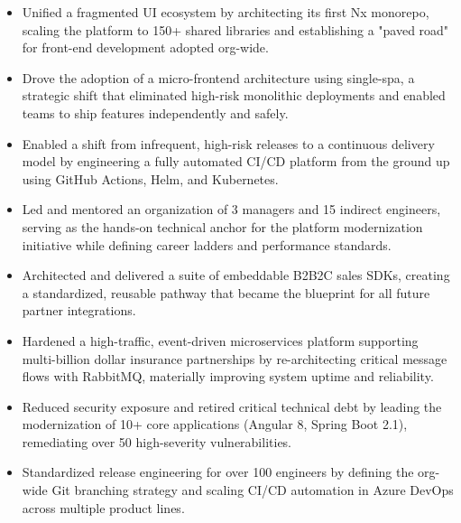 \begin{itemize}[leftmargin=*]
    \item Unified a fragmented UI ecosystem by architecting its first Nx monorepo, scaling the platform to 150+ shared libraries and establishing a "paved road" for front-end development adopted org-wide.
    \item Drove the adoption of a micro-frontend architecture using single-spa, a strategic shift that eliminated high-risk monolithic deployments and enabled teams to ship features independently and safely.
    \item Enabled a shift from infrequent, high-risk releases to a continuous delivery model by engineering a fully automated CI/CD platform from the ground up using GitHub Actions, Helm, and Kubernetes.
    \item Led and mentored an organization of 3 managers and 15 indirect engineers, serving as the hands-on technical anchor for the platform modernization initiative while defining career ladders and performance standards.
\end{itemize}
\vspace{\jobGroupBottomMargin}

\begin{itemize}[leftmargin=*]
    \item Architected and delivered a suite of embeddable B2B2C sales SDKs, creating a standardized, reusable pathway that became the blueprint for all future partner integrations.
    \item Hardened a high-traffic, event-driven microservices platform supporting multi-billion dollar insurance partnerships by re-architecting critical message flows with RabbitMQ, materially improving system uptime and reliability.
    \item Reduced security exposure and retired critical technical debt by leading the modernization of 10+ core applications (Angular 8, Spring Boot 2.1), remediating over 50 high-severity vulnerabilities.
    \item Standardized release engineering for over 100 engineers by defining the org-wide Git branching strategy and scaling CI/CD automation in Azure DevOps across multiple product lines.
\end{itemize}
\vspace{\jobGroupBottomMargin}

